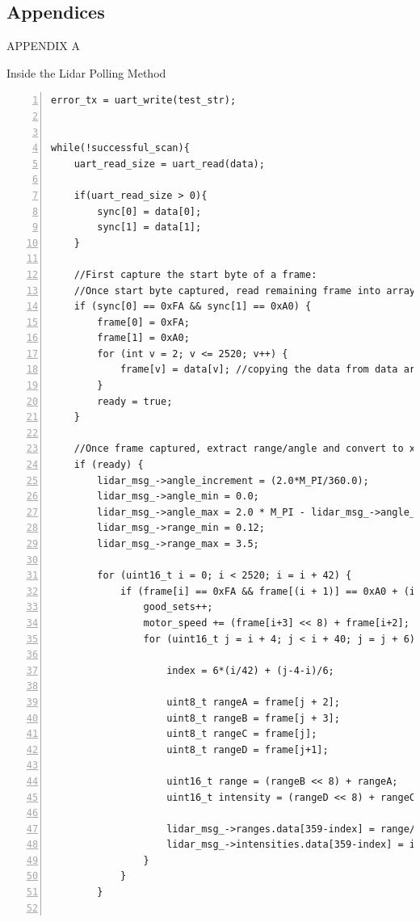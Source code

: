 \documentclass[conference]{IEEEtran}
\begin{document}
\subsection{Appendices}
\begin{center}APPENDIX A
\end{center}
\begin{center}Inside the Lidar Polling Method
\end{center}
\begin{lstlisting}[frame=leftline, breaklines=true, numbers=left, stepnumber=1, numbersep=5pt]
error_tx = uart_write(test_str);


while(!successful_scan){
    uart_read_size = uart_read(data);
        
    if(uart_read_size > 0){
        sync[0] = data[0];
        sync[1] = data[1];
    }
    
    //First capture the start byte of a frame:
    //Once start byte captured, read remaining frame into array:
    if (sync[0] == 0xFA && sync[1] == 0xA0) {
        frame[0] = 0xFA;
        frame[1] = 0xA0;
        for (int v = 2; v <= 2520; v++) {
            frame[v] = data[v]; //copying the data from data array to frame
        }
        ready = true;
    }  
    
    //Once frame captured, extract range/angle and convert to x/y:
    if (ready) {
        lidar_msg_->angle_increment = (2.0*M_PI/360.0);
        lidar_msg_->angle_min = 0.0;
        lidar_msg_->angle_max = 2.0 * M_PI - lidar_msg_->angle_increment;
        lidar_msg_->range_min = 0.12;
        lidar_msg_->range_max = 3.5;
        
        for (uint16_t i = 0; i < 2520; i = i + 42) {
            if (frame[i] == 0xFA && frame[(i + 1)] == 0xA0 + (i / 42)) {                    
                good_sets++;
                motor_speed += (frame[i+3] << 8) + frame[i+2]; //accumlate count for avg. time increment
                for (uint16_t j = i + 4; j < i + 40; j = j + 6) {
                
                    index = 6*(i/42) + (j-4-i)/6;

                    uint8_t rangeA = frame[j + 2];
                    uint8_t rangeB = frame[j + 3];
                    uint8_t rangeC = frame[j];
                    uint8_t rangeD = frame[j+1];

                    uint16_t range = (rangeB << 8) + rangeA;
                    uint16_t intensity = (rangeD << 8) + rangeC; 

                    lidar_msg_->ranges.data[359-index] = range/1000.0;
                    lidar_msg_->intensities.data[359-index] = intensity;
                }
            }
        }
        

\end{lstlisting}
\end{document}
